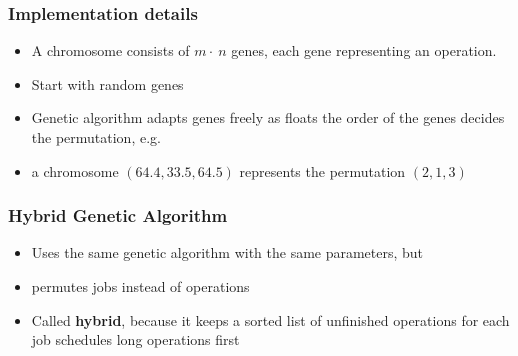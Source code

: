 
\begin{frame}
    \frametitle{Implementation details}
    \begin{itemize}

    	\item A chromosome consists of $m\cdot~n$ genes, each gene representing an operation.

    	\item Start with random genes

    	\item Genetic algorithm adapts genes freely as floats \textrightarrow \hspace{.5em} the order of the genes decides the permutation, e.g.

    	\item a chromosome $(64.4, 33.5, 64.5)$ represents the permutation $(2,1,3)$
    \end{itemize}
\end{frame}


\begin{frame}
  \frametitle{Hybrid Genetic Algorithm}
\begin{itemize}

	\item 	Uses the same genetic algorithm with the same parameters, but

	\item  	permutes jobs instead of operations

	\item 	Called \textbf{hybrid}, because it keeps a sorted list of unfinished operations for each job \textrightarrow \hspace{.5em} schedules long operations first
	
\end{itemize}


 
\end{frame}



